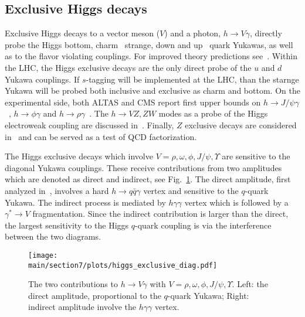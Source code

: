 \documentclass[../report.tex]{subfiles}
\providecommand{\main}{..}
\begin{document}
\subsection{Exclusive Higgs decays}
\label{sec:exclusiveHiggs}

Exclusive Higgs decays to a vector meson ($V$) and a photon, $h\to V\gamma$, directly probe the Higgs bottom, charm~\cite{Bodwin:2013gca,Bodwin:2014bpa} strange, down and up~\cite{Kagan:2014ila} quark Yukawas, as well as to the flavor violating couplings. 
For improved theory predictions see~\cite{Koenig:2015pha}.
Within the LHC, the Higgs exclusive decays are the only direct probe of the $u$ and $d$ Yukawa couplings. If $s$-tagging will be implemented at the LHC, than the starnge Yukawa will be probed both inclusive and exclusive as charm and bottom.  
On the experimental side, both ALTAS and CMS report first upper bounds on $h\to J/\psi\gamma$~\cite{Aad:2015sda,Khachatryan:2015lga}, $h\to\phi\gamma$ and $h\to\rho\gamma$~\cite{Aaboud:2016rug,Aaboud:2017xnb}. 
The $h \to VZ, ZW$ modes as a probe of the Higgs electroweak coupling are discussed  in~\cite{Isidori:2013cla}. 
Finally, $Z$ exclusive decays are considered in~\cite{Grossmann:2015lea,Alte:2015dpo} and can be served as a test of QCD factorization. 

The Higgs exclusive decays which involve $V=\rho,\omega,\phi,J/\psi,\Upsilon$ are sensitive to the diagonal Yukawa couplings. 
These receive contributions from two amplitudes which are denoted as direct and indirect, see Fig.~\ref{fig:hexlusive}. 
The direct amplitude, first analyzed in~\cite{Keung:1983ac}, involves a hard $h\to q\bar{q}\gamma$ vertex and sensitive to the $q$-quark Yukawa. 
The indirect process is mediated by $h\gamma\gamma$ vertex which is followed by a $\gamma^*\to V$ fragmentation. 
Since the indirect contribution is larger than the direct, the largest sensitivity to the Higgs $q$-quark coupling is via the interference between the two diagrams. 
\begin{figure}[t]
\begin{center}
\texttt{[image: \\main/section7/plots/higgs\_exclusive\_diag.pdf]}
\caption{The two contributions to $h \to V\gamma$ with $V=\rho,\omega,\phi,J/\psi,\Upsilon$. Left: the direct amplitude, proportional to  the $q$-quark Yukawa; Right: indirect amplitude involve the $h\gamma\gamma$ vertex.}
\label{fig:hexlusive}
\end{center}
\end{figure}
\end{document}
